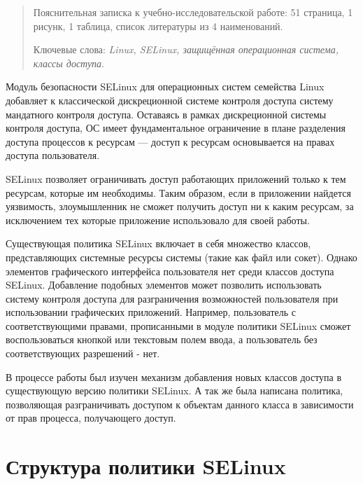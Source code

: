 \documentclass{./../class/UIR}
\begin{document}
\maketitle
\begin{abstract}
Пояснительная записка к учебно-исследовательской работе: 51 страница, 1 
рисунк, 1 таблица, список литературы из 4 наименований.

Ключевые слова: \textit{Linux, SELinux, защищённая операционная система,
классы доступа}.

\end{abstract}

\tableofcontents
{}
	Модуль безопасности SELinux для операционных систем семейства Linux добавляет к
	классической дискреционной системе контроля доступа систему мандатного
	контроля доступа. Оставаясь в рамках дискреционной системы контроля доступа, ОС
	имеет фундаментальное ограничение в плане разделения доступа процессов к
	ресурсам — доступ к ресурсам основывается на правах доступа пользователя.

	SELinux позволяет ограничивать доступ работающих приложений только к
	тем ресурсам, которые им необходимы. Таким образом, если в
	приложении найдется уязвимость, злоумышленник не сможет получить
	доступ ни к каким ресурсам, за исключением тех которые приложение
	использовало для своей работы.

	Существующая политика SELinux включает в себя множество классов, представляющих
	системные ресурсы системы (такие как файл или сокет). Однако элементов
	графического интерфейса пользователя нет среди классов доступа SELinux.
	Добавление подобных элементов может позволить использовать систему контроля
	доступа для разграничения возможностей пользователя при использовании
	графических приложений. Например, пользователь с соответствующими правами,
	прописанными в модуле политики SELinux сможет воспользоваться кнопкой или
	текстовым полем ввода, а пользователь без соответствующих разрешений - нет.

	В процессе работы был изучен механизм добавления новых классов доступа в
	существующую версию политики SELinux. А так же была написана политика,
	позволяющая разграничивать доступом к объектам данного класса в зависимости от
	прав процесса, получающего доступ.


\section{Структура политики SELinux}	
\end{document}

